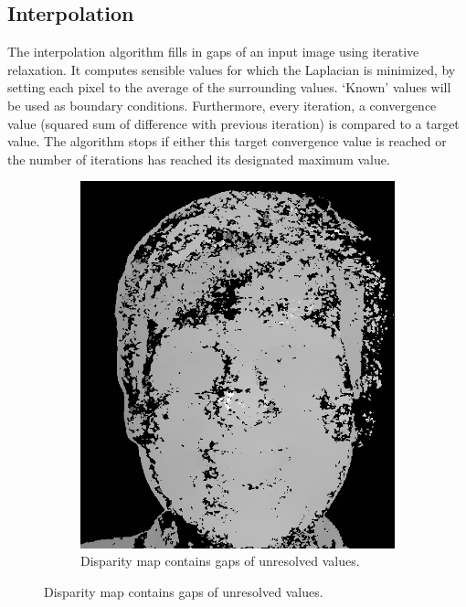 \documentclass[journal]{IEEEtran}
\begin{document}
\subsection{Interpolation}
\label{sec:interpolation}
The interpolation algorithm fills in gaps of an input image using iterative relaxation. It computes sensible values for which the Laplacian is minimized, by setting each pixel to the average of the surrounding values. `Known' values will be used as boundary conditions. Furthermore, every iteration, a convergence value (squared sum of difference with previous iteration) is compared to a target value. The algorithm stops if either this target convergence value is reached or the number of iterations has reached its designated maximum value. %

\begin{figure}[h]
    \centering
    \begin{subfigure}[t]{0.45\linewidth}
        \centering
        \includegraphics[width=\linewidth]{Pics/disparity-gaps.png}
        \caption{Disparity map contains gaps of unresolved values.}
        \label{fig:disparity-gaps}
    \end{subfigure}

\end{figure}
\end{document}
